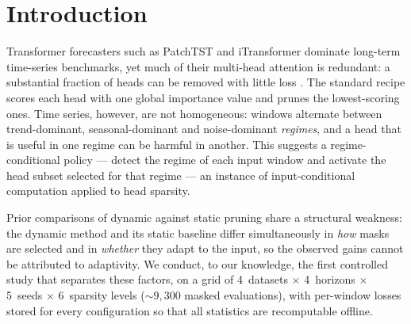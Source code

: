 
\section{Introduction}
\label{sec:intro}

Transformer forecasters such as PatchTST \citep{nie2023patchtst} and
iTransformer \citep{liu2024itransformer} dominate long-term time-series
benchmarks, yet much of their multi-head attention is redundant: a
substantial fraction of heads can be removed with little loss
\citep{michel2019sixteen,voita2019analyzing}. The standard recipe scores
each head with one global importance value and prunes the lowest-scoring
ones. Time series, however, are not homogeneous: windows alternate between
trend-dominant, seasonal-dominant and noise-dominant \emph{regimes}, and a
head that is useful in one regime can be harmful in another. This suggests
a regime-conditional policy --- detect the regime of each input window and
activate the head subset selected for that regime --- an instance of
input-conditional computation \citep{han2021dynamic} applied to head
sparsity.

Prior comparisons of dynamic against static pruning share a structural
weakness: the dynamic method and its static baseline differ
simultaneously in \emph{how} masks are selected and in \emph{whether}
they adapt to the input, so the observed gains cannot be attributed to
adaptivity. We conduct, to our knowledge, the first controlled study that
separates these factors, on a grid of 4~datasets $\times$ 4~horizons
$\times$ 5~seeds $\times$ 6~sparsity levels (${\sim}9{,}300$ masked
evaluations), with per-window losses stored for every configuration so
that all statistics are recomputable offline.

